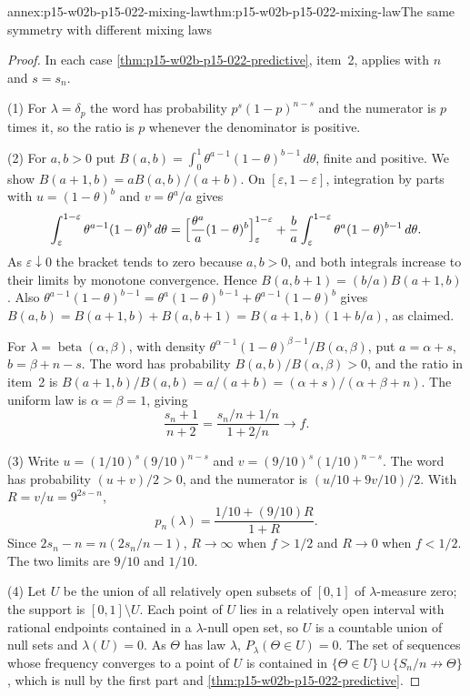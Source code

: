 \begin{annexitem}{annex:p15-w02b-p15-022-mixing-law}{thm:p15-w02b-p15-022-mixing-law}{The same symmetry with different mixing laws}
\begin{proof}
In each case \cref{thm:p15-w02b-p15-022-predictive}, item~2, applies with
\(n\) and \(s=s_n\).

(1) For \(\lambda=\delta_p\) the word has probability
\(p^{s}(1-p)^{n-s}\) and the numerator is \(p\) times it, so the ratio is
\(p\) whenever the denominator is positive.

(2) For \(a,b>0\) put \(B(a,b)=\int_0^1\theta^{a-1}(1-\theta)^{b-1}\,d\theta\),
finite and positive. We show \(B(a+1,b)=aB(a,b)/(a+b)\). On
\([\varepsilon,1-\varepsilon]\), integration by parts with
\(u=(1-\theta)^b\) and \(v=\theta^a/a\) gives
\[
 \int_\varepsilon^{1-\varepsilon}\theta^{a-1}(1-\theta)^b\,d\theta
 =\Bigl[\frac{\theta^a}{a}(1-\theta)^b\Bigr]_\varepsilon^{1-\varepsilon}
 +\frac ba\int_\varepsilon^{1-\varepsilon}\theta^a(1-\theta)^{b-1}\,d\theta .
\]
As \(\varepsilon\downarrow0\) the bracket tends to zero because \(a,b>0\),
and both integrals increase to their limits by monotone convergence. Hence
\(B(a,b+1)=(b/a)B(a+1,b)\). Also
\(\theta^{a-1}(1-\theta)^{b-1}=\theta^a(1-\theta)^{b-1}+\theta^{a-1}(1-\theta)^b\)
gives \(B(a,b)=B(a+1,b)+B(a,b+1)=B(a+1,b)(1+b/a)\), as claimed.

For \(\lambda=\operatorname{beta}(\alpha,\beta)\), with density
\(\theta^{\alpha-1}(1-\theta)^{\beta-1}/B(\alpha,\beta)\), put
\(a=\alpha+s\), \(b=\beta+n-s\). The word has probability
\(B(a,b)/B(\alpha,\beta)>0\), and the ratio in item~2 is
\(B(a+1,b)/B(a,b)=a/(a+b)=(\alpha+s)/(\alpha+\beta+n)\).
The uniform law is \(\alpha=\beta=1\), giving
\[
 \frac{s_n+1}{n+2}=\frac{s_n/n+1/n}{1+2/n}\longrightarrow f .
\]

(3) Write \(u=(1/10)^{s}(9/10)^{n-s}\) and \(v=(9/10)^s(1/10)^{n-s}\).
The word has probability \((u+v)/2>0\), and the numerator is
\((u/10+9v/10)/2\). With \(R=v/u=9^{2s-n}\),
\[
 p_n(\lambda)=\frac{1/10+(9/10)R}{1+R}.
\]
Since \(2s_n-n=n(2s_n/n-1)\), \(R\to\infty\) when \(f>1/2\) and
\(R\to0\) when \(f<1/2\). The two limits are \(9/10\) and \(1/10\).

(4) Let \(U\) be the union of all relatively open subsets of \([0,1]\) of
\(\lambda\)-measure zero; the support is \([0,1]\setminus U\). Each point of
\(U\) lies in a relatively open interval with rational endpoints contained in
a \(\lambda\)-null open set, so \(U\) is a countable union of null sets and
\(\lambda(U)=0\). As \(\Theta\) has law \(\lambda\), \(P_\lambda(\Theta\in
U)=0\). The set of sequences whose frequency converges to a point of \(U\)
is contained in \(\{\Theta\in U\}\cup\{S_n/n\not\to\Theta\}\), which is
null by the first part and \cref{thm:p15-w02b-p15-022-predictive}.
\end{proof}
\end{annexitem}

